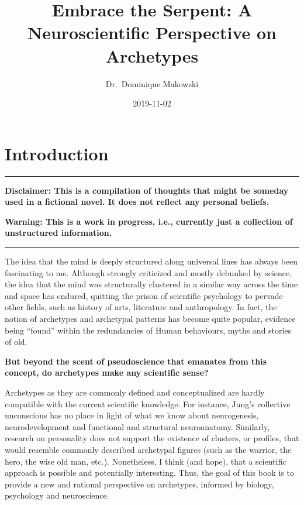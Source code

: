 \documentclass[]{book}
\title{Embrace the Serpent: A Neuroscientific Perspective on Archetypes}
\author{Dr.~Dominique Makowski}
\date{2019-11-02}
\begin{document}
\maketitle

{
\setcounter{tocdepth}{1}
\tableofcontents
}
\hypertarget{introduction}{%
\chapter{Introduction}\label{introduction}}

\begin{center}\rule{0.5\linewidth}{\linethickness}\end{center}

\textbf{Disclaimer: This is a compilation of thoughts that might be someday used in a fictional novel. It does not reflect any personal beliefs.}

\textbf{Warning: This is a work in progress, i.e., currently just a collection of unstructured information.}

\begin{center}\rule{0.5\linewidth}{\linethickness}\end{center}

The idea that the mind is deeply structured along universal lines has always been fascinating to me. Although strongly criticized and mostly debunked by science, the idea that the mind was structurally clustered in a similar way across the time and space has endured, quitting the prison of scientific psychology to pervade other fields, such as history of arts, literature and anthropology. In fact, the notion of archetypes and archetypal patterns has become quite popular, evidence being ``found'' within the redundancies of Human behaviours, myths and stories of old.

\textbf{But beyond the scent of pseudoscience that emanates from this concept, do archetypes make any scientific sense?}

Archetypes as they are commonly defined and conceptualized are hardly compatible with the current scientific knowledge. For instance, Jung's collective unconscious has no place in light of what we know about neurogenesis, neurodevelopment and functional and structural neuroanatomy. Similarly, research on personality does not support the existence of clusters, or profiles, that would resemble commonly described archetypal figures (such as the warrior, the hero, the wise old man, etc.). Nonetheless, I think (and hope), that a scientific approach is possible and potentially interesting. Thus, the goal of this book is to provide a new and rational perspective on archetypes, informed by biology, psychology and neuroscience.
\end{document}

